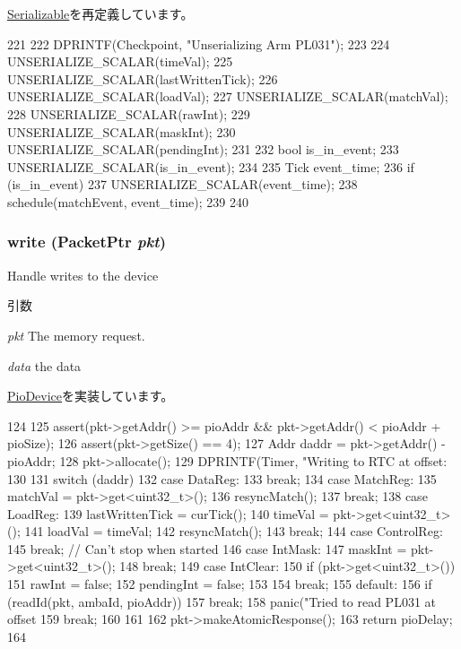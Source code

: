 \hyperlink{classSerializable_af100c4e9feabf3cd918619c88c718387}{Serializable}を再定義しています。


\begin{DoxyCode}
221 {
222     DPRINTF(Checkpoint, "Unserializing Arm PL031\n");
223 
224     UNSERIALIZE_SCALAR(timeVal);
225     UNSERIALIZE_SCALAR(lastWrittenTick);
226     UNSERIALIZE_SCALAR(loadVal);
227     UNSERIALIZE_SCALAR(matchVal);
228     UNSERIALIZE_SCALAR(rawInt);
229     UNSERIALIZE_SCALAR(maskInt);
230     UNSERIALIZE_SCALAR(pendingInt);
231 
232     bool is_in_event;
233     UNSERIALIZE_SCALAR(is_in_event);
234 
235     Tick event_time;
236     if (is_in_event){
237         UNSERIALIZE_SCALAR(event_time);
238         schedule(matchEvent, event_time);
239     }
240 }
\end{DoxyCode}
\hypertarget{classPL031_a4cefab464e72b5dd42c003a0a4341802}{
\subsubsection[{write}]{ write ({\bf PacketPtr} {\em pkt})}}
\label{classPL031_a4cefab464e72b5dd42c003a0a4341802}
Handle writes to the device 
\begin{DoxyParams}{引数}
\item[{\em pkt}]The memory request. \item[{\em data}]the data \end{DoxyParams}


\hyperlink{classPioDevice_afe8371668d023bb2516b286e5e399b6f}{PioDevice}を実装しています。


\begin{DoxyCode}
124 {
125     assert(pkt->getAddr() >= pioAddr && pkt->getAddr() < pioAddr + pioSize);
126     assert(pkt->getSize() == 4);
127     Addr daddr = pkt->getAddr() - pioAddr;
128     pkt->allocate();
129     DPRINTF(Timer, "Writing to RTC at offset: %
130 
131     switch (daddr) {
132       case DataReg:
133         break;
134       case MatchReg:
135         matchVal = pkt->get<uint32_t>();
136         resyncMatch();
137         break;
138       case LoadReg:
139         lastWrittenTick = curTick();
140         timeVal = pkt->get<uint32_t>();
141         loadVal = timeVal;
142         resyncMatch();
143         break;
144       case ControlReg:
145         break; // Can't stop when started
146       case IntMask:
147         maskInt = pkt->get<uint32_t>();
148         break;
149       case IntClear:
150         if (pkt->get<uint32_t>()) {
151             rawInt = false;
152             pendingInt = false;
153         }
154         break;
155       default:
156         if (readId(pkt, ambaId, pioAddr))
157             break;
158         panic("Tried to read PL031 at offset %
159         break;
160     }
161 
162     pkt->makeAtomicResponse();
163     return pioDelay;
164 }
\end{DoxyCode}


